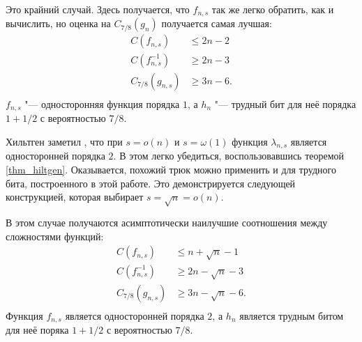 \documentclass[a4paper, 14pt]{extarticle}
\begin{document}
\begin{construction}[$s = n - 1$.]
Это крайний случай. Здесь получается, что $f_{n, s}$ так же легко обратить, как
и вычислить, но оценка на $C_{7/8}(g_n)$ получается самая лучшая:
\[
\begin{aligned}
C(f_{n, s}) &\leq 2n - 2 \\
C(f_{n, s}^{-1}) &\geq 2n - 3 \\
C_{7/8}(g_{n, s}) &\geq 3n - 6. \\
\end{aligned}
\]
$f_{n,s}$ "--- односторонняя функция порядка $1$, а $h_{n}$ "--- трудный бит для
неё порядка $1 + 1/2$ с вероятностью $7/8$.
\end{construction}

Хильтген заметил \cite{hiltgen1993,hiltgen1994}, что при $s = o(n)$ и $s =
\omega(1)$ функция $\lambda_{n,s}$ является односторонней порядка $2$. В этом
легко убедиться, воспользовавшись теоремой \ref{thm_hiltgen}. Оказывается,
похожий трюк можно применить и для трудного бита, построенного в этой работе.
Это демонстрируется следующей конструкцией, которая выбирает $s = \sqrt n =
o(n)$.

\begin{construction}[$s = \sqrt{n}$.]
В этом случае получаются асимптотически наилучшие соотношения между сложностями
функций:
\[
\begin{aligned}
C(f_{n, s}) &\leq n + \sqrt{n} - 1 \\
C(f_{n, s}^{-1}) &\geq 2n - \sqrt n - 3 \\
C_{7/8}(g_{n, s}) &\geq 3n - \sqrt{n} - 6. \\
\end{aligned}
\]
Функция $f_{n, s}$ является односторонней порядка $2$, а $h_{n}$ является
трудным битом для неё поряка $1 + 1/2$ с вероятностью $7/8$.
\end{construction}

{}

\end{document}
